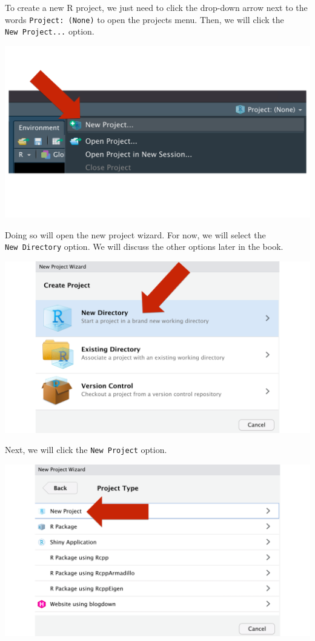 \documentclass[
  letterpaper,
  DIV=11,
  numbers=noendperiod]{scrreprt}
\begin{document}
To create a new R project, we just need to click the drop-down arrow
next to the words \texttt{Project:\ (None)} to open the projects menu.
Then, we will click the \texttt{New\ Project...} option.

\includegraphics{chapters/r_projects/create_02_new_project.png}

Doing so will open the new project wizard. For now, we will select the
\texttt{New\ Directory} option. We will discuss the other options later
in the book.

\includegraphics{chapters/r_projects/create_03_new_directory.png}

Next, we will click the \texttt{New\ Project} option.

\includegraphics{chapters/r_projects/create_04_new_project.png}
\end{document}
